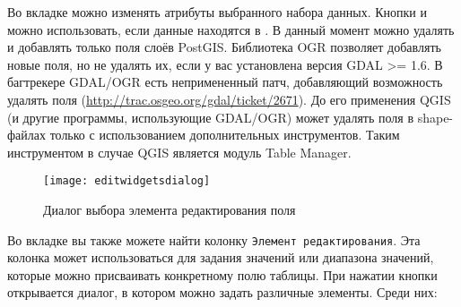 Во вкладке  можно изменять атрибуты выбранного набора данных.
Кнопки  и
 можно использовать, если
данные находятся в .
В данный момент можно удалять и добавлять только поля слоёв PostGIS.
Библиотека OGR позволяет добавлять новые поля, но не удалять их, если
у вас установлена версия GDAL >= 1.6. В багтрекере GDAL/OGR есть непримененный
патч, добавляющий возможность удалять поля (\url{http://trac.osgeo.org/gdal/ticket/2671}).
До его применения QGIS (и другие программы, использующие GDAL/OGR) может
удалять поля в shape-файлах только с использованием дополнительных
инструментов. Таким инструментом в случае QGIS является модуль Table Manager.


\begin{figure}[ht]
   \centering
   \texttt{[image: editwidgetsdialog]}
   \caption{Диалог выбора элемента редактирования поля
\wincaption}\label{fig:editwidget}
\end{figure}

Во вкладке  вы также можете найти колонку
\texttt{Элемент редактирования}. Эта колонка может использоваться для
задания значений или диапазона значений, которые можно присваивать
конкретному полю таблицы. При нажатии кнопки 
открывается диалог, в котором можно задать различные элементы. Среди них:

